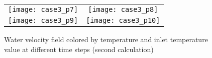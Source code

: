 \begin{figure}
\begin{center}
\begin{tabular}{cc}
\texttt{[image: case3\_p7]} &
\texttt{[image: case3\_p8]} \\
\texttt{[image: case3\_p9]} &
\texttt{[image: case3\_p10]} \\
\end{tabular}
\caption{Water velocity field colored by temperature and inlet temperature value
at different time steps (second calculation)}
\label{fige2_e3}
\end{center}
\end{figure}






